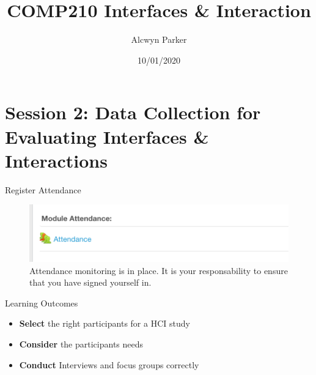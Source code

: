 \documentclass[ignorenonframetext,]{beamer}
\title{COMP210 Interfaces \& Interaction}
\author{Alcwyn Parker}
\date{10/01/2020}
\providecommand{\tightlist}{%
  \setlength{\itemsep}{0pt}\setlength{\parskip}{0pt}}
\begin{document}
\frame{\titlepage}

\hypertarget{session-2-data-collection-for-evaluating-interfaces-interactions}{%
\section{Session 2: Data Collection for Evaluating Interfaces \&
Interactions}\label{session-2-data-collection-for-evaluating-interfaces-interactions}}

\begin{block}{Register Attendance}

\begin{figure}
\centering
\includegraphics{assets/attendance.png}
\caption{Attendance monitoring is in place. It is your responsability to
ensure that you have signed yourself in.}
\end{figure}

\end{block}

\begin{block}{Learning Outcomes}

\begin{itemize}
\tightlist
\item
  \textbf{Select} the right participants for a HCI study
\item
  \textbf{Consider} the participants needs
\item
  \textbf{Conduct} Interviews and focus groups correctly
\end{itemize}

\end{block}
\end{document}
